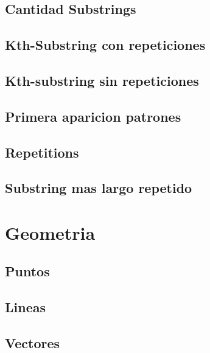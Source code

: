 \subsection{Cantidad Substrings}
\raggedbottom
\hrulefill
\subsection{Kth-Substring con repeticiones}
\raggedbottom
\hrulefill
\subsection{Kth-substring sin repeticiones}
\raggedbottom
\hrulefill
\subsection{Primera aparicion patrones}
\raggedbottom
\hrulefill
\subsection{Repetitions}
\raggedbottom
\hrulefill
\subsection{Substring mas largo repetido}
\raggedbottom
\hrulefill

\section{Geometria}
\subsection{Puntos}
\raggedbottom
\hrulefill
\subsection{Lineas}
\raggedbottom
\hrulefill
\subsection{Vectores}
\raggedbottom
\hrulefill
